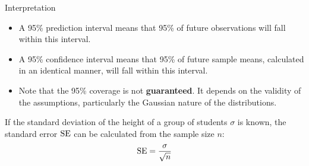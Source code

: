 \begin{frame}{Interpretation}
	\begin{itemize}
		\item A 95\% prediction interval means that 95\% of future observations will fall within this interval.
		\pause
		\item A 95\% confidence interval means that 95\% of future sample means, calculated in an identical manner, will fall within this interval.
		\pause
		\item Note that the 95\% coverage is not \textbf{guaranteed}. It depends on the validity of the assumptions, particularly the Gaussian nature of the distributions.
	\end{itemize}
	\pause
	If the standard deviation of the height of a group of students $\sigma$ is known, the standard error $\ET$ can be calculated from the sample size $n$:
	\begin{equation}
		\ET = \frac{\sigma}{\sqrt{n}}
		\nonumber
	\end{equation}
\end{frame}